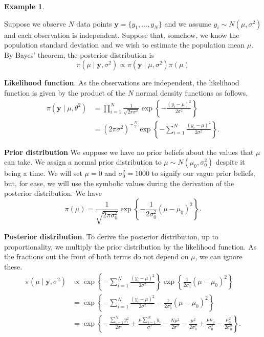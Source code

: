 \documentclass[
]{book}
\theoremstyle{definition}
\theoremstyle{definition}
\newtheorem{example}{Example}[chapter]
\theoremstyle{definition}
\theoremstyle{definition}
\theoremstyle{remark}
\begin{document}
\begin{example}
\protect\hypertarget{exm:normal}{}\label{exm:normal}

Suppose we observe \(N\) data points \(\boldsymbol{y} = \{y_1, \ldots, y_N\}\) and we assume \(y_i \sim N(\mu, \sigma^2)\) and each observation is independent. Suppose that, somehow, we know the population standard deviation and we wish to estimate the population mean \(\mu\). By Bayes' theorem, the posterior distribution is
\[
\pi(\mu \mid \boldsymbol{y}, \sigma^2) \propto \pi(\boldsymbol{y} \mid \mu, \sigma^2) \pi(\mu)
\]

\textbf{Likelihood function}.
As the observations are independent, the likelihood function is given by the product of the \(N\) normal density functions as follows,
\begin{align*}
\pi(\boldsymbol{y} \mid \mu, \theta^2) &= \prod_{i=1}^{N} \frac{1}{\sqrt{2\pi\sigma^2}}\exp\left\{-\frac{(y_i - \mu)^2}{2\sigma^2}\right\} \\
&= (2\pi\sigma^2)^{-\frac{N}{2}}\exp\left\{-\sum_{i=1}^{N}\frac{(y_i - \mu)^2}{2\sigma^2}\right\}.
\end{align*}

\textbf{Prior distribution} We suppose we have no prior beliefs about the values that \(\mu\) can take. We assign a normal prior distribution to \(\mu \sim N(\mu_0, \sigma_0^2)\) despite it being a time. We will set \(\mu = 0\) and \(\sigma_0^2 = 1000\) to signify our vague prior beliefs, but, for ease, we will use the symbolic values during the derivation of the posterior distribution. We have
\[
\pi(\mu) = \frac{1}{\sqrt{2\pi\sigma_0^2}}\exp\left\{-\frac{1}{2\sigma_0^2}(\mu - \mu_0)^2\right\}.
\]

\textbf{Posterior distribution}. To derive the posterior distribution, up to proportionality, we multiply the prior distribution by the likelihood function. As the fractions out the front of both terms do not depend on \(\mu\), we can ignore these.
\begin{align*}
\pi(\mu \mid \boldsymbol{y}, \sigma^2) &\propto\exp\left\{-\sum_{i=1}^{N}\frac{(y_i - \mu)^2}{2\sigma^2}\right\}  \exp\left\{\frac{1}{2\sigma_0^2}(\mu - \mu_0)^2\right\} \\
& = \exp\left\{-\sum_{i=1}^{N}\frac{(y_i - \mu)^2}{2\sigma^2}-\frac{1}{2\sigma_0^2}(\mu - \mu_0)^2\right\} \\
& = \exp\left\{-\frac{\sum_{i=1}^{N}y_i^2}{2\sigma^2} + \frac{\mu\sum_{i=1}^{N}y_i}{\sigma^2} - \frac{N\mu^2}{2\sigma^2} - \frac{\mu^2}{2\sigma_0^2} + \frac{\mu\mu_0}{\sigma_0^2} - \frac{\mu_0^2}{2\sigma_0^2}\right\}.
\end{align*}


\end{example}
\end{document}

